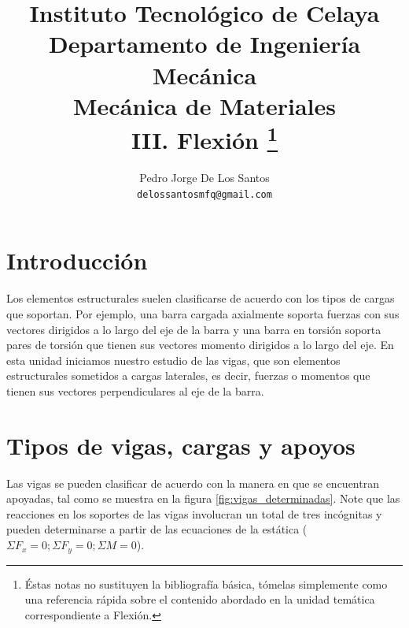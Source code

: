 \documentclass[12pt,letterpaper]{article}
\author{
{\small Pedro Jorge De Los Santos}\\[-2mm]
{\small\tt delossantosmfq@gmail.com}
}
\title{
\vspace{-20mm}
{\normalsize Instituto Tecnológico de Celaya} \\[-4mm]
{\normalsize Departamento de Ingeniería Mecánica} \\[-4mm]
{\normalsize Mecánica de Materiales} \\[-4mm]
{\bfseries\normalsize III. Flexión
\footnote{Éstas notas no sustituyen la bibliografía básica, tómelas simplemente como una referencia rápida sobre el contenido 
abordado en la unidad temática correspondiente a Flexión.}
}
}
\date{}
\begin{document}
\maketitle
\tableofcontents


\section{Introducción}

Los elementos estructurales suelen clasificarse de acuerdo con los tipos de
cargas que soportan. Por ejemplo, una barra cargada axialmente soporta
fuerzas con sus vectores dirigidos a lo largo del eje de la barra y una barra
en torsión soporta pares de torsión que tienen sus vectores
momento dirigidos a lo largo del eje. En esta unidad iniciamos nuestro
estudio de las vigas, que son elementos estructurales sometidos
a cargas laterales, es decir, fuerzas o momentos que tienen sus vectores
perpendiculares al eje de la barra.

\section{Tipos de vigas, cargas y apoyos}
  
Las vigas se pueden clasificar de acuerdo con la manera en que se encuentran apoyadas, tal como se muestra 
en la figura \ref{fig:vigas_determinadas}. Note que las reacciones en los soportes de las vigas involucran 
un total de tres incógnitas y pueden determinarse a partir de las ecuaciones de la estática 
($\Sigma F_x =0; \Sigma F_y = 0; \Sigma M =0$).
\end{document}
